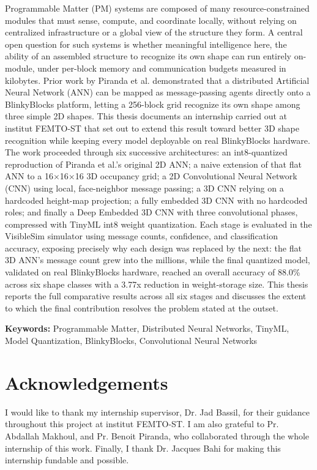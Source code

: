 \documentclass[12pt,a4paper]{report}
\begin{document}
Programmable Matter (PM) systems are composed of many resource-constrained modules that must sense, compute, and coordinate locally, without relying on centralized infrastructure or a global view of the structure they form. A central open question for such systems is whether meaningful intelligence here, the ability of an assembled structure to recognize its own shape can run entirely on-module, under per-block memory and communication budgets measured in kilobytes. Prior work by Piranda et al. demonstrated that a distributed Artificial Neural Network (ANN) can be mapped as message-passing agents directly onto a BlinkyBlocks platform, letting a 256-block grid recognize its own shape among three simple 2D shapes. This thesis documents an internship carried out at institut FEMTO-ST that set out to extend this result toward better 3D shape recognition while keeping every model deployable on real BlinkyBlocks hardware. The work proceeded through six successive architectures: an int8-quantized reproduction of Piranda et al.'s original 2D ANN; a naive extension of that flat ANN to a 16$\times$16$\times$16 3D occupancy grid; a 2D Convolutional Neural Network (CNN) using local, face-neighbor message passing; a 3D CNN relying on a hardcoded height-map projection; a fully embedded 3D CNN with no hardcoded roles; and finally a Deep Embedded 3D CNN with three convolutional phases, compressed with TinyML int8 weight quantization. Each stage is evaluated in the VisibleSim simulator using message counts, confidence, and classification accuracy, exposing precisely why each design was replaced by the next: the flat 3D ANN's message count grew into the millions, while the final quantized model, validated on real BlinkyBlocks hardware, reached an overall accuracy of 88.0\% across six shape classes with a 3.77x reduction in weight-storage size. This thesis reports the full comparative results across all six stages and discusses the extent to which the final contribution resolves the problem stated at the outset.

\vspace{1cm}
\noindent\textbf{Keywords:} Programmable Matter, Distributed Neural Networks, TinyML, Model Quantization, BlinkyBlocks, Convolutional Neural Networks

\chapter*{Acknowledgements}

I would like to thank my internship supervisor, Dr. Jad Bassil, for their guidance throughout this project at institut FEMTO-ST. I am also grateful to Pr. Abdallah Makhoul, and Pr. Benoit Piranda, who collaborated through the whole internship of this work. Finally, I thank Dr. Jacques Bahi for making this internship fundable and possible.
\end{document}
